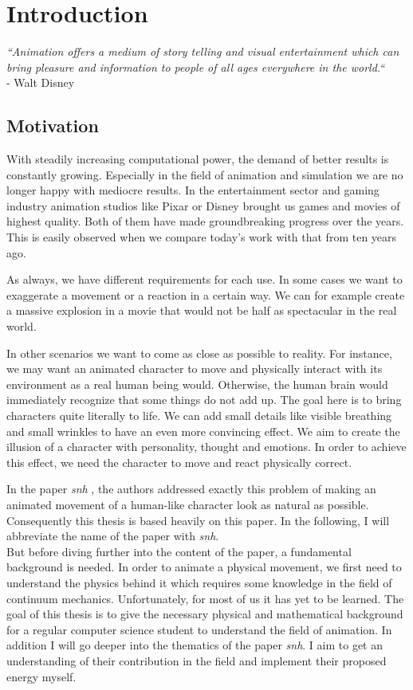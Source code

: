 \chapter{Introduction}
\textit{``Animation offers a medium of story telling and visual entertainment which can bring pleasure and information to people of all ages everywhere in the world.``} \\
- Walt Disney


\section{Motivation}
With steadily increasing computational power, the demand of better results is constantly growing. Especially in the field of animation and simulation we are no longer happy with mediocre results. 
In the entertainment sector and gaming industry animation studios like Pixar\textsuperscript{\textcopyright} or Disney\textsuperscript{\textcopyright} brought us games and movies of highest quality. Both of them have made groundbreaking progress over the years. This is easily observed when we compare today's work with that from ten years ago. 

As always, we have different requirements for each use.
In some cases we want to exaggerate a movement or a reaction in a certain way. We can for example create a massive explosion in a movie that would not be half as spectacular in the real world. 

In other scenarios we want to come as close as possible to reality. For instance, we may want an animated character to move and physically interact with its environment as a real human being would. Otherwise, the human brain would immediately recognize that some things do not add up.
The goal here is to bring characters quite literally to life. We can add small details like visible breathing and small wrinkles to have an even more convincing effect. We aim to create the illusion of a character with personality, thought and emotions. In order to achieve this effect, we need the character to move and react physically correct. 

In the paper \textit{\acrlong{snh}} \cite{Smith:2018:SNF:3191713.3180491}, the authors addressed exactly this problem of making an animated movement of a human-like character look as natural as possible. Consequently this thesis is based heavily on this paper. In the following, I will abbreviate the name of the paper with \textit{\acrshort{snh}}. \\
But before diving further into the content of the paper, a fundamental background is needed. In order to animate a physical movement, we first need to understand the physics behind it which requires some knowledge in the field of continuum mechanics. Unfortunately, for most of us it has yet to be learned. The goal of this thesis is to give the necessary physical and mathematical background for a regular computer science student to understand the field of animation. In addition I will go deeper into the thematics of the paper \textit{\acrshort {snh}}. I aim to get an understanding of their contribution in the field and implement their proposed energy myself.


